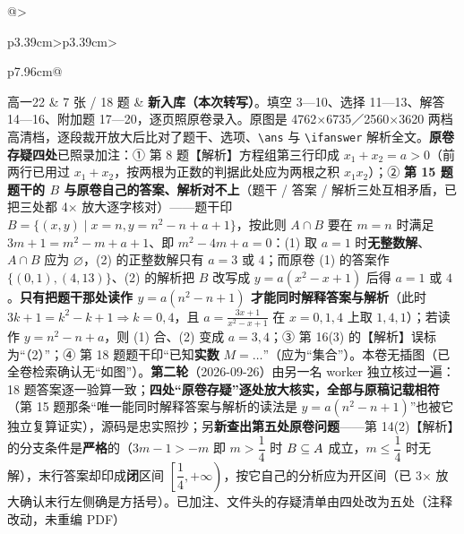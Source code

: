 \documentclass[a4paper,11pt]{article}
\begin{document}
\begin{xltabular}{\textwidth}{@{}>{\raggedright\arraybackslash}p{3.39cm}>{\centering\arraybackslash}p{3.39cm}>{\raggedright\arraybackslash}p{7.96cm}@{}}
高一22 & 7 张 / 18 题 & \textbf{新入库（本次转写）}。填空 3---10、选择 11---13、解答 14---16、附加题 17---20，逐页照原卷录入。原图是 4762$\times$6735／2560$\times$3620 两档高清档，逐段裁开放大后比对了题干、选项、\texttt{\textbackslash{}ans} 与 \texttt{\textbackslash{}ifanswer} 解析全文。\textbf{原卷存疑四处}已照录加注：① 第 8 题【解析】方程组第三行印成 \(x_1+x_2=a>0\)（前两行已用过 \(x_1+x_2\)，按两根为正数的判据此处应为两根之积 \(x_1x_2\)）；② \textbf{第 15 题题干的 \(B\) 与原卷自己的答案、解析对不上}（题干 / 答案 / 解析三处互相矛盾，已把三处都 4$\times$ 放大逐字核对）------题干印 \(B=\allowbreak \{(x,y)\mid\allowbreak  x=n,y=n^2-n+a+\allowbreak 1\}\)，按此则 \(A\cap\allowbreak  B\) 要在 \(m=n\) 时满足 \(3m+\allowbreak 1=m^2-m+a+\allowbreak 1\)、即 \(m^2-4m+a=\allowbreak 0\)：(1) 取 \(a=\allowbreak 1\) 时\textbf{无整数解}、\(A\cap\allowbreak  B\) 应为 \(\varnothing\)，(2) 的正整数解只有 \(a=\allowbreak 3\) 或 \(4\)；而原卷 (1) 的答案作 \(\{(0,\allowbreak 1),\allowbreak (4,\allowbreak 13)\}\)、(2) 的解析把 \(B\) 改写成 \(y=a(x^2-x+\allowbreak 1)\) 后得 \(a=\allowbreak 1\) 或 \(4\)。\textbf{只有把题干那处读作 \(y=a(n^2-n+\allowbreak 1)\) 才能同时解释答案与解析}（此时 \(3k+\allowbreak 1=k^2-k+\allowbreak 1\Rightarrow k=\allowbreak 0,\allowbreak 4\)，且 \(a=\allowbreak \frac{3x+\allowbreak 1}{x^2-x+\allowbreak 1}\) 在 \(x=\allowbreak 0,\allowbreak 1,\allowbreak 4\) 上取 \(1,\allowbreak 4,\allowbreak 1\)）；若读作 \(y=n^2-n+a\)，则 (1) 合、(2) 变成 \(a=\allowbreak 3,\allowbreak 4\)；③ 第 16(3) 的【解析】误标为``（2）''；④ 第 18 题题干印``已知\textbf{实数} \(M=\allowbreak \dots\)''（应为``集合''）。本卷无插图（已全卷检索确认无``如图''）。\textbf{第二轮}（2026-09-26）由另一名 worker 独立核过一遍：18 题答案逐一验算一致；\textbf{四处``原卷存疑''逐处放大核实，全部与原稿记载相符}（第 15 题那条``唯一能同时解释答案与解析的读法是 \(y=a(n^2-n+\allowbreak 1)\)''也被它独立复算证实），源码是忠实照抄；另\textbf{新查出第五处原卷问题}------第 14(2)【解析】的分支条件是\textbf{严格}的（\(3m-1>-m\) 即 \(m>\dfrac14\) 时 \(B\subseteq A\) 成立，\(m\leqslant\allowbreak \dfrac14\) 时无解），末行答案却印成\textbf{闭}区间 \(\left[\dfrac14,\allowbreak +\allowbreak \infty\right)\)，按它自己的分析应为开区间（已 3$\times$ 放大确认末行左侧确是方括号）。已加注、文件头的存疑清单由四处改为五处（注释改动，未重编 PDF） \\ \addlinespace[1pt]

\end{xltabular}
\end{document}
